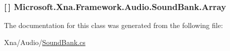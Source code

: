 \subsubsection[{Array}]{ \mbox{[}$\,$\mbox{]} Microsoft.\+Xna.\+Framework.\+Audio.\+Sound\+Bank.\+Array\hspace{0.3cm}{\ttfamily [static]}}\label{class_microsoft_1_1_xna_1_1_framework_1_1_audio_1_1_sound_bank_a610714aedb527ad104f6960d89b58205}


The documentation for this class was generated from the following file\+:\begin{DoxyCompactItemize}
\item 
Xna/\+Audio/\hyperlink{_sound_bank_8cs}{Sound\+Bank.\+cs}\end{DoxyCompactItemize}
